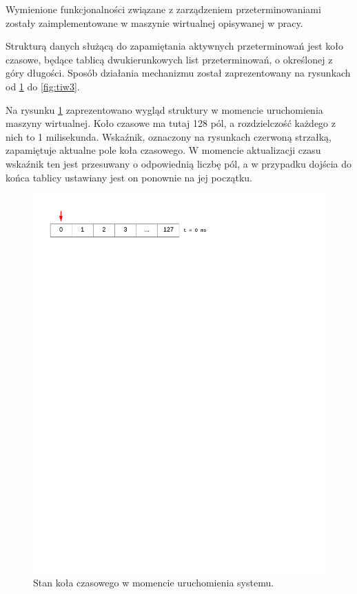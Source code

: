 Wymienione funkcjonalności związane z zarządzeniem przeterminowaniami zostały zaimplementowane w maszynie wirtualnej opisywanej w pracy.

Strukturą danych służącą do zapamiętania aktywnych przeterminowań jest koło czasowe, będące tablicą dwukierunkowych list przeterminowań, o określonej z góry długości. Sposób działania mechanizmu został zaprezentowany na rysunkach od \ref{fig:tiw1} do \ref{fig:tiw3}.

Na rysunku \ref{fig:tiw1} zaprezentowano wygląd struktury w momencie uruchomienia maszyny wirtualnej.
Koło czasowe ma tutaj 128 pól, a rozdzielczość każdego z nich to 1 milisekunda.
Wskaźnik, oznaczony na rysunkach czerwoną strzałką, zapamiętuje aktualne pole koła czasowego.
W momencie aktualizacji czasu wskaźnik ten jest przesuwany o odpowiednią liczbę pól, a w przypadku dojścia do końca tablicy ustawiany jest on ponownie na jej początku.
\begin{figure}[h]
\centerline{\includegraphics[scale=0.75, clip, trim=10mm 245mm 80mm 10mm]{tiw1}}
\caption{Stan koła czasowego w momencie uruchomienia systemu.}
\label{fig:tiw1}
\end{figure}

